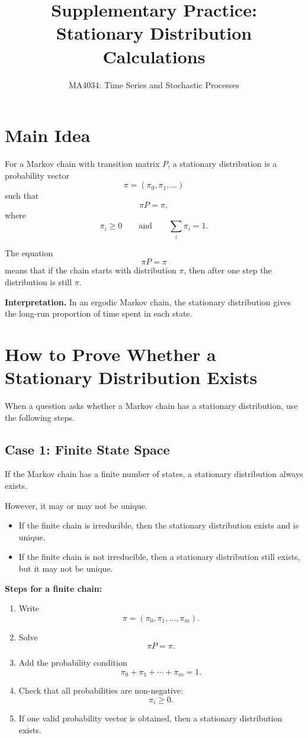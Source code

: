 \documentclass[12pt,a4paper]{article}
\title{\textbf{Supplementary Practice: Stationary Distribution Calculations}}
\author{MA4034: Time Series and Stochastic Processes}
\date{}
\theoremstyle{notestyle}
\begin{document}
\maketitle

\section{Main Idea}

For a Markov chain with transition matrix $P$, a stationary distribution is a probability vector
\[
\pi=(\pi_0,\pi_1,\ldots)
\]
such that
\[
\pi P=\pi,
\]
where
\[
\pi_i\geq 0
\qquad\text{and}\qquad
\sum_i \pi_i=1.
\]

The equation
\[
\pi P=\pi
\]
means that if the chain starts with distribution $\pi$, then after one step the distribution is still $\pi$.

\textbf{Interpretation.} In an ergodic Markov chain, the stationary distribution gives the long-run proportion of time spent in each state.

\section{How to Prove Whether a Stationary Distribution Exists}

When a question asks whether a Markov chain has a stationary distribution, use the following steps.

\subsection*{Case 1: Finite State Space}

If the Markov chain has a finite number of states, a stationary distribution always exists.

However, it may or may not be unique.

\begin{itemize}[leftmargin=1.2cm]
    \item If the finite chain is irreducible, then the stationary distribution exists and is unique.
    \item If the finite chain is not irreducible, then a stationary distribution still exists, but it may not be unique.
\end{itemize}

\textbf{Steps for a finite chain:}

\begin{enumerate}[leftmargin=1.2cm]
    \item Write
    \[
    \pi=(\pi_0,\pi_1,\ldots,\pi_m).
    \]
    \item Solve
    \[
    \pi P=\pi.
    \]
    \item Add the probability condition
    \[
    \pi_0+\pi_1+\cdots+\pi_m=1.
    \]
    \item Check that all probabilities are non-negative:
    \[
    \pi_i\geq 0.
    \]
    \item If one valid probability vector is obtained, then a stationary distribution exists.
\end{enumerate}
\end{document}
